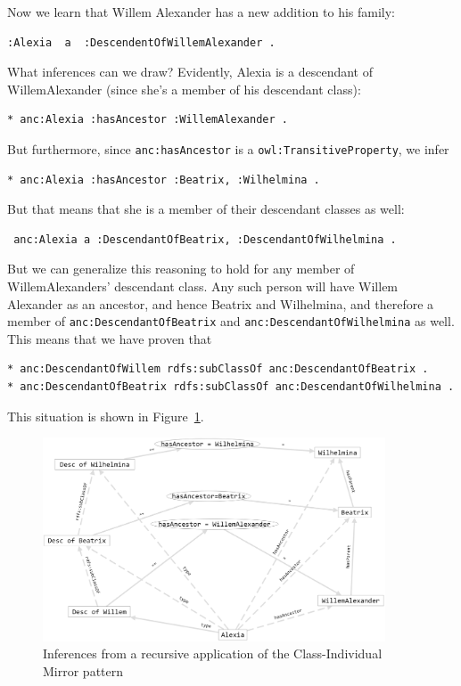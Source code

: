 Now we learn that Willem Alexander has a new addition to his family:

\begin{lstlisting}
:Alexia  a  :DescendentOfWillemAlexander .
\end{lstlisting}

What inferences can we draw?  Evidently, Alexia is a descendant of WillemAlexander
(since she's a member of his descendant class):

\begin{lstlisting}
* anc:Alexia :hasAncestor :WillemAlexander .
\end{lstlisting}

But furthermore, since \texttt{anc:hasAncestor} is a \texttt{owl:TransitiveProperty}, 
we infer

\begin{lstlisting}
* anc:Alexia :hasAncestor :Beatrix, :Wilhelmina .
\end{lstlisting}

But that means that she is a member of their descendant classes as well: 

\begin{lstlisting}
 anc:Alexia a :DescendantOfBeatrix, :DescendantOfWilhelmina .
\end{lstlisting}

But we can generalize this reasoning to hold for any member of WillemAlexanders' descendant class. 
Any such person will have  Willem Alexander as an ancestor, and hence Beatrix and Wilhelmina, 
and therefore a member of \texttt{anc:DescendantOfBeatrix} and 
\texttt{anc:DescendantOfWilhelmina} as well.  This means that we have proven that

\begin{lstlisting}
* anc:DescendantOfWillem rdfs:subClassOf anc:DescendantOfBeatrix .
* anc:DescendantOfBeatrix rdfs:subClassOf anc:DescendantOfWilhelmina .
\end{lstlisting}

This situation is shown in Figure~\ref{fig:ch12.12}.  

\begin{figure}
    \centering
    \includegraphics[width=4in]{SWWOv3/media/ch12/figure12-12.png}
    \caption{Inferences from a recursive application of the Class-Individual Mirror pattern}
    \label{fig:ch12.12}
\end{figure}

